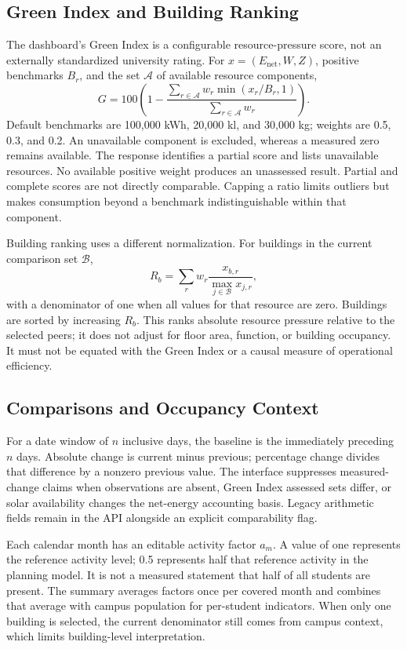 \documentclass[conference]{IEEEtran}
\begin{document}
\subsection{Green Index and Building Ranking}
The dashboard's Green Index is a configurable resource-pressure score, not an externally standardized university rating. For $x=(E_{\mathrm{net}},W,Z)$, positive benchmarks $B_r$, and the set $\mathcal{A}$ of available resource components,
\begin{equation}
G=100\left(1-\frac{\sum_{r\in\mathcal{A}}w_r\min(x_r/B_r,1)}{\sum_{r\in\mathcal{A}}w_r}\right).
\label{eq:green}
\end{equation}
Default benchmarks are 100,000 kWh, 20,000 kl, and 30,000 kg; weights are 0.5, 0.3, and 0.2. An unavailable component is excluded, whereas a measured zero remains available. The response identifies a partial score and lists unavailable resources. No available positive weight produces an unassessed result. Partial and complete scores are not directly comparable. Capping a ratio limits outliers but makes consumption beyond a benchmark indistinguishable within that component.

Building ranking uses a different normalization. For buildings in the current comparison set $\mathcal{B}$,
\begin{equation}
R_b=\sum_r w_r\frac{x_{b,r}}{\max_{j\in\mathcal{B}}x_{j,r}},
\end{equation}
with a denominator of one when all values for that resource are zero. Buildings are sorted by increasing $R_b$. This ranks absolute resource pressure relative to the selected peers; it does not adjust for floor area, function, or building occupancy. It must not be equated with the Green Index or a causal measure of operational efficiency.

\subsection{Comparisons and Occupancy Context}
For a date window of $n$ inclusive days, the baseline is the immediately preceding $n$ days. Absolute change is current minus previous; percentage change divides that difference by a nonzero previous value. The interface suppresses measured-change claims when observations are absent, Green Index assessed sets differ, or solar availability changes the net-energy accounting basis. Legacy arithmetic fields remain in the API alongside an explicit comparability flag.

Each calendar month has an editable activity factor $a_m$. A value of one represents the reference activity level; 0.5 represents half that reference activity in the planning model. It is not a measured statement that half of all students are present. The summary averages factors once per covered month and combines that average with campus population for per-student indicators. When only one building is selected, the current denominator still comes from campus context, which limits building-level interpretation.
\end{document}
